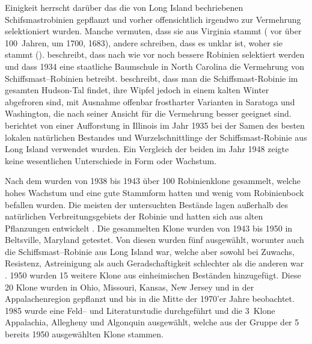 \documentclass[twocolumn]{scrartcl}
\begin{document}
Einigkeit herrscht darüber das die von Long Island
bechriebenen Schifsmastrobinien gepflanzt und vorher offensichtlich
irgendwo zur Vermehrung selektioniert wurden. Manche vermuten, dass sie
aus Virginia stammt (\cite{hicks1883robinie} vor über 100~Jahren,
\cite{raber1936shipmast} um 1700, \cite{detwiler1937robinie} 1683),
andere schreiben, dass es unklar ist, woher sie stammt
(\cite{raber1938robinie}). \cite{detwiler1937robinie} beschreibt,
dass nach wie vor noch bessere Robinien selektiert werden und dass
1934 eine staatliche Baumschule in North Carolina die Vermehrung von
Schiffsmast--Robinien betreibt.
\cite{cope1938robinie} beschreibt, dass man die Schiffsmast-Robinie im
gesamten Hudson-Tal findet, ihre Wipfel jedoch in einem kalten Winter
abgefroren sind, mit Ausnahme offenbar frostharter Varianten in
Saratoga und Washington, die nach seiner Ansicht für die Vermehrung
besser geeignet sind.
\cite{minckler1948robinie} berichtet von einer Aufforstung in Illinois
im Jahr 1935 bei der Samen des besten lokalen natürlichen Bestandes
und Wurzelschnittlinge der Schiffsmast-Robinie aus Long Island
verwendet wurden. Ein Vergleich der beiden im Jahr 1948 zeigte keine
wesentlichen Unterschiede in Form oder Wachstum.

Nach dem \cite{steinergroup1987robinie} wurden von 1938 bis 1943 über 100
Robinienklone gesammelt, welche hohes Wachstum und eine gute Stammform hatten
und wenig vom Robinienbock befallen wurden. Die meisten der untersuchten
Bestände lagen außerhalb des natürlichen Verbreitungsgebiets der Robinie und
hatten sich aus alten Pflanzungen entwickelt \citep{hopp1941robinie}. Die
gesammelten Klone wurden von 1943 bis 1950 in Beltsville, Maryland getestet. Von
diesen wurden fünf ausgewählt, worunter auch die Schiffsmast--Robinie aus Long
Island war, welche aber sowohl bei Zuwachs, Resistenz, Astreinigung als auch
Geradschaftigkeit schlechter als die anderen war \citep{santamour1960robinie}.
1950 wurden 15 weitere Klone aus einheimischen Beständen hinzugefügt. Diese 20
Klone wurden in Ohio, Missouri, Kansas, New Jersey und in der Appalachenregion
gepflanzt und bis in die Mitte der 1970'er Jahre beobachtet. 1985 wurde eine
Feld-- und Literaturstudie durchgeführt und die 3~Klone Appalachia, Allegheny
und Algonquin ausgewählt, welche aus der Gruppe der 5 bereits 1950 ausgewählten
Klone stammen.
\end{document}
